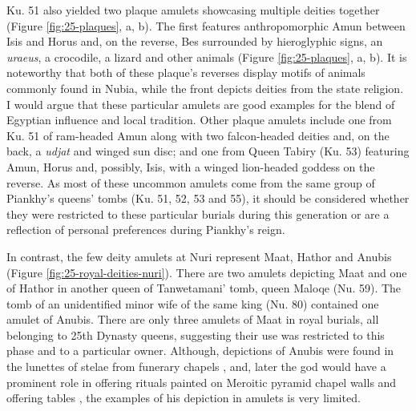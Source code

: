 Ku. 51 also yielded two plaque amulets showcasing multiple deities together (Figure \ref{fig:25-plaques}, a, b). The first features anthropomorphic Amun between Isis and Horus and, on the reverse, Bes surrounded by hieroglyphic signs, an \textit{uraeus}, a crocodile, a lizard and other animals (Figure \ref{fig:25-plaques}, a, b). It is noteworthy that both of these plaque's reverses display motifs of animals commonly found in Nubia, while the front depicts deities from the state religion. I would argue that these particular amulets are good examples for the blend of Egyptian influence and local tradition. Other plaque amulets include one from Ku. 51 of ram-headed Amun along with two falcon-headed deities and, on the back, a \textit{udjat} and winged sun disc; and one from Queen Tabiry (Ku. 53) featuring Amun, Horus and, possibly, Isis, with a winged lion-headed goddess on the reverse. As most of these uncommon amulets come from the same group of Piankhy's queens' tombs (Ku. 51, 52, 53 and 55), it should be considered whether they were restricted to these particular burials during this generation or are a reflection of personal preferences during Piankhy's reign.


In contrast, the few deity amulets at Nuri represent Maat, Hathor and Anubis (Figure \ref{fig:25-royal-deities-nuri}). There are two amulets depicting Maat and one of Hathor in another queen of Tanwetamani' tomb, queen Maloqe (Nu. 59). The tomb of an unidentified minor wife of the same king (Nu. 80) contained one amulet of Anubis. There are only three amulets of Maat in royal burials, all belonging to 25th Dynasty queens, suggesting their use was restricted to this phase and to a particular owner. Although, depictions of Anubis were found in the lunettes of stelae from funerary chapels \parencites[p.~636]{lohwasserNapatanNecropoleisBurial2019}, and, later the god would have a prominent role in offering rituals painted on Meroitic pyramid chapel walls and offering tables \parencites[p.~791-799]{helmbold-doyéTombArchitectureBurial2019}[p.~577]{yellinProlegomenaStudyMeroitic2020}, the examples of his depiction in amulets is very limited.


